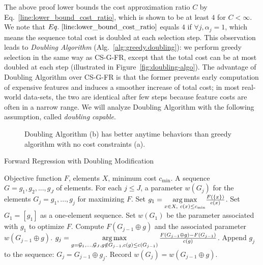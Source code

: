 The above proof lower bounds the cost approximation ratio $C$ by Eq.~\ref{line:lower_bound_cost_ratio}, which is shown to be at least $4$ for $C < \infty$. We note that $Eq.~\ref{line:lower_bound_cost_ratio}$ equals $4$ if $\forall j, \alpha_j = 1$, which means the sequence total cost is doubled at each selection step.
This observation leads to \textit{Doubling Algorithm} (Alg.~\ref{alg:greedy.doubling}): we perform greedy selection in the same way as CS-G-FR, except that the total cost can be at most doubled at each step (illustrated in Figure~\ref{fig:doubling-algo}). 
The advantage of Doubling Algorithm over 
CS-G-FR is that 
the former prevents early computation of expensive features and induces a smoother increase of total cost; in most real-world data-sets, the two are identical after few steps because 
feature costs are often in a narrow range. 
We will analyze Doubling Algorithm with the following assumption, called \textit{doubling capable}.

\begin{figure}
\centering
{}



\caption{Doubling Algorithm (b) has better anytime behaviors 
than greedy algorithm with no cost constraints (a).}
\label{fig:doubling}
\end{figure}


\begin{algorithm}[tb]
\caption{Forward Regression with Doubling Modification}
 \label{alg:greedy.doubling}
\begin{algorithmic}[1]
	 Objective function $F$, elements $X$, minimum cost $c_{\textrm{min}}$.
	 A sequence $G = g_1, g_2, ..., g_{J}$ of elements.
   For each $j \leq J$, a parameter  $w(G_j)$ for the elements $G_j =g_1,..., g_j$ for maximizing $F$. 
    \STATE Set $g_1 = \underset{x \in X,\ c(x) \le c_{\textrm{min}}}{\operatorname*{arg\,max}} \frac{F(\{x\})}{c(x)}$.
    \STATE Set $G_1 = [g_1]$ as a one-element sequence.
    \STATE Set $w(G_1)$ be the parameter associated with $g_1$ to optimize $F$.
        \STATE Compute $F(G_{j-1} \oplus g)$ and the associated parameter $w(G_{j-1} \oplus g)$.  
    \ENDFOR
    \STATE $g_{j} = \operatorname*{arg\,max} \limits_{g = \mathcal{G}_1, ... , \mathcal{G}_J, g\notin G_{j-1}, c(g) \le c(G_{j-1})} 
	\frac{F(G_{j-1} \oplus g) - F(G_{j-1})}{c(g)}$.
   \STATE Append $g_j$ to the sequence: $G_{j} = G_{j-1} \oplus g_{j}$.
   \STATE Record $w(G_j) = w(G_{j-1} \oplus g)$.
 \ENDFOR
\end{algorithmic}
\end{algorithm}


